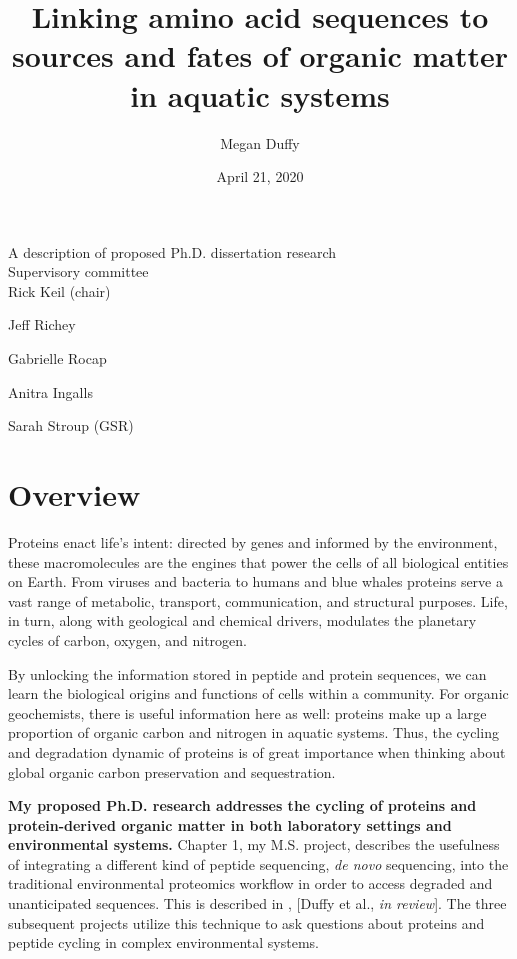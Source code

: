 \documentclass[12pt, letterpaper, twoside]{article}
\title{Linking amino acid sequences to sources and fates of organic matter in aquatic systems}
\author{Megan Duffy}
\date{April 21, 2020}
\begin{document}
	
	\begin{titlepage}
		
		\maketitle
		\begin{center}
			A description of proposed Ph.D. dissertation research \\
			\bigskip
			\bigskip
			Supervisory committee \\
			\bigskip
			Rick Keil (chair) 
			
			Jeff Richey 
			
			Gabrielle Rocap 
			
			Anitra Ingalls 
			
			Sarah Stroup (GSR)
		\end{center}
		
	\end{titlepage}
	

\newpage

\tableofcontents{}

\newpage

\section*{Overview}

Proteins enact life’s intent: directed by genes and informed by the environment, these macromolecules are the engines that power the cells of all biological entities on Earth. From viruses and bacteria to humans and blue whales proteins serve a vast range of metabolic, transport, communication, and structural purposes. Life, in turn, along with geological and chemical drivers, modulates the planetary cycles of carbon, oxygen, and nitrogen.

By unlocking the information stored in peptide and protein sequences, we can learn the biological origins and functions of cells within a community. For organic geochemists, there is useful information here as well: proteins make up a large proportion of organic carbon and nitrogen in aquatic systems. Thus, the cycling and degradation dynamic of proteins is of great importance when thinking about global organic carbon preservation and sequestration. 

\textbf{My proposed Ph.D. research addresses the cycling of proteins and protein-derived organic matter in both laboratory settings and environmental systems.} Chapter 1, my M.S. project, describes the usefulness of integrating a different kind of peptide sequencing, \textit{de novo} sequencing, into the traditional environmental proteomics workflow in order to access degraded and unanticipated sequences. This is described in , [Duffy et al., \textit{in review}]. The three subsequent projects utilize this technique to ask questions about proteins and peptide cycling in complex environmental systems. 
\end{document}
